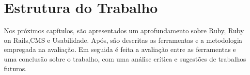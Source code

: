 \chapter{Estrutura do Trabalho}

Nos próximos capítulos, são apresentados um aprofundamento sobre Ruby, Ruby on Rails,CMS e Usabilidade. Após, são descritas as ferramentas e a metodologia empregada na avaliação. Em seguida é feita a avaliação entre as ferramentas e uma conclusão sobre o trabalho, com uma análise crítica e sugestões de trabalhos futuros.



